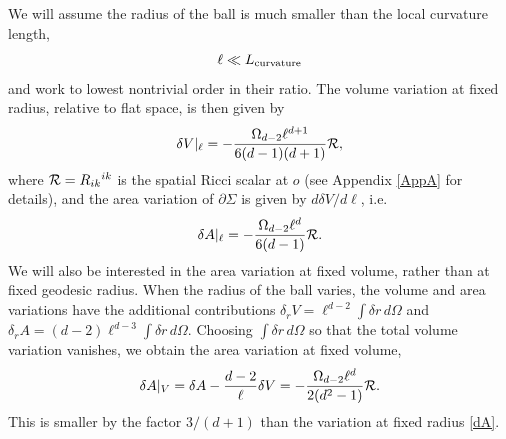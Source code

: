 \documentclass[aps,prd,twocolumn,showpacs,groupedaddress,nofootinbib,longbibliography]{revtex4-1}
\def\beq{\begin{equation}}
\def\eeq{\end{equation}}
\def\d{\delta}\def\D{\Delta}
\def\O{\Omega}
\begin{document}
We will assume the radius of the ball is much smaller than the local curvature length,
%
\beq
\ell\ll L_{\rm curvature}
\eeq
% 
and work to lowest nontrivial order in their ratio. 
The volume variation at fixed radius, relative to flat space, is then given by
%
\beq\label{dV}
\d V|_{\ell} = -\frac{\O_{d-2}\ell^{d+1}}{6(d-1)(d+1)}{\cal R},
\eeq
%
where ${\cal R}=R_{ik}{}^{ik}$ is the spatial Ricci scalar  at $o$ (see Appendix \ref{AppA} for details),
and the area variation of $\partial\Sigma$ is given by $d\d V/d\ell$, i.e.\ 
%
\beq\label{dA}
\d A|_{\ell} = -\frac{\O_{d-2} \ell^d }{6(d-1)}{\cal R}.
\eeq
%
We will also be interested in the area variation at fixed volume, rather than at fixed geodesic radius.
When the radius of the ball varies, the volume and area variations have the additional contributions
$\d_r V = \ell^{d-2}\int \d r\, d\O$ and $\d_r A = (d-2)\ell^{d-3}\int \d r\, d\O$.
Choosing $\int \d r\, d\O$ so that the total volume variation vanishes, 
we obtain the area variation at fixed volume,
%
\beq\label{dAV}
\d A|_V = \d A - \frac{d-2}{\ell}\d V=
-\frac{\O_{d-2}\ell^d}{2(d^2-1)} {\cal R}. 
\eeq
%
This is smaller  by the factor 
$3/(d+1)$ than the variation at fixed radius \eqref{dA}.
\end{document}
